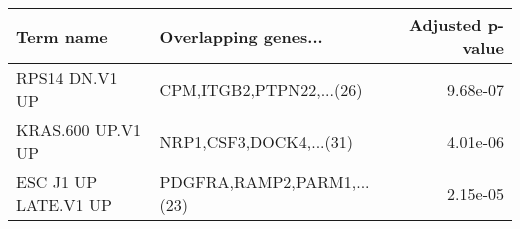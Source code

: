 \begin{tabular}{llr}
\toprule
           Term name &       Overlapping genes... &  Adjusted p-value \\
\midrule
      RPS14 DN.V1 UP &   CPM,ITGB2,PTPN22,...(26) &          9.68e-07 \\
   KRAS.600 UP.V1 UP &    NRP1,CSF3,DOCK4,...(31) &          4.01e-06 \\
ESC J1 UP LATE.V1 UP & PDGFRA,RAMP2,PARM1,...(23) &          2.15e-05 \\
\bottomrule
\end{tabular}
